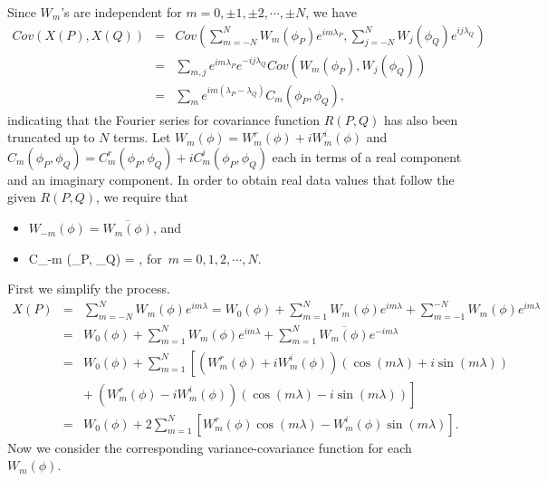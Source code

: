 Since $W_m$'s are independent for $m =0, \pm 1, \pm 2, \cdots, \pm N$, we have			
	\begin{eqnarray*}
		Cov(X(P), {X(Q)}) &=& Cov\left(\sum_{m = -N}^{N} W_m(\phi_P) e^{i m \lambda_P}, \sum_{j=-N}^{N} {W_j(\phi_Q)} e^{i j \lambda_Q}\right) \\
		&=& \sum_{m, j} e^{i m \lambda_P} e^{-i j \lambda_Q} Cov(W_m(\phi_P), {W_j(\phi_Q)}) \\
		&=& \sum_{m} e^{im (\lambda_P - \lambda_Q)} C_m(\phi_P, \phi_Q),
	\end{eqnarray*}
indicating that the Fourier series for covariance function $R(P, Q)$ has also been truncated up to $N$ terms. Let $W_m(\phi) = W_{m}^{r}(\phi) + i W_{m}^i(\phi)$ and $C_m(\phi_P, \phi_Q) = C_m^r(\phi_P, \phi_Q) + i C_m^i(\phi_P, \phi_Q)$ each in terms of a real component and an imaginary component. In order to obtain real data values that follow the given $R(P, Q)$, we require that
\begin{itemize}
\item $W_{-m}(\phi) = \overline{W_m(\phi)}$, and
\item \beq \label{eq:for_real}
	C_{-m} (\phi_P, \phi_Q) = , \quad \mbox{for $m = 0, 1, 2, \cdots, N$.}
	\eeq
\end{itemize}
First we simplify the process.
	\begin{eqnarray} \label{eq:finite_process}
		X(P) &=& \sum_{m = -N}^N W_m(\phi) e^{im \lambda} =  W_0(\phi) + \sum_{m =1}^N W_m(\phi) e^{im \lambda} + \sum_{m =-1}^{-N} W_m(\phi) e^{im \lambda} \nonumber \\
		&=& W_0(\phi) + \sum_{m =1}^N W_m(\phi) e^{im \lambda} + \sum_{m =1}^{N} \overline{W_m(\phi)} e^{-im \lambda} \nonumber \\
		&=& W_0(\phi) + \sum_{m =1}^N \left[  (W_m^r(\phi)+iW_m^i(\phi))(\cos(m \lambda) + i \sin(m \lambda)) \right. \nonumber \\
		& & \left. +\ (W_m^r(\phi)-iW_m^i(\phi))(\cos(m \lambda) - i \sin(m \lambda))  \right]  \nonumber \\
		&=& W_0(\phi) + 2 \sum_{m =1}^N \left[W_m^r(\phi)\cos(m\lambda) - W_m^i(\phi)\sin(m \lambda)\right].
	\end{eqnarray}
Now we consider the corresponding variance-covariance function for each $W_m(\phi)$.   			
 
